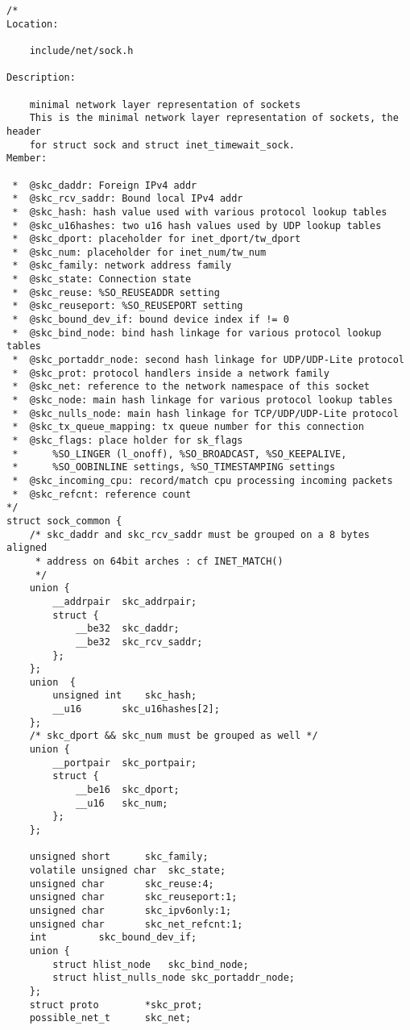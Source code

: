 \begin{verbatim}
/*
Location:

    include/net/sock.h

Description:

    minimal network layer representation of sockets
    This is the minimal network layer representation of sockets, the header
    for struct sock and struct inet_timewait_sock.
Member:

 *  @skc_daddr: Foreign IPv4 addr
 *  @skc_rcv_saddr: Bound local IPv4 addr
 *  @skc_hash: hash value used with various protocol lookup tables
 *  @skc_u16hashes: two u16 hash values used by UDP lookup tables
 *  @skc_dport: placeholder for inet_dport/tw_dport
 *  @skc_num: placeholder for inet_num/tw_num
 *  @skc_family: network address family
 *  @skc_state: Connection state
 *  @skc_reuse: %SO_REUSEADDR setting
 *  @skc_reuseport: %SO_REUSEPORT setting
 *  @skc_bound_dev_if: bound device index if != 0
 *  @skc_bind_node: bind hash linkage for various protocol lookup tables
 *  @skc_portaddr_node: second hash linkage for UDP/UDP-Lite protocol
 *  @skc_prot: protocol handlers inside a network family
 *  @skc_net: reference to the network namespace of this socket
 *  @skc_node: main hash linkage for various protocol lookup tables
 *  @skc_nulls_node: main hash linkage for TCP/UDP/UDP-Lite protocol
 *  @skc_tx_queue_mapping: tx queue number for this connection
 *  @skc_flags: place holder for sk_flags
 *      %SO_LINGER (l_onoff), %SO_BROADCAST, %SO_KEEPALIVE,
 *      %SO_OOBINLINE settings, %SO_TIMESTAMPING settings
 *  @skc_incoming_cpu: record/match cpu processing incoming packets
 *  @skc_refcnt: reference count
*/
struct sock_common {
    /* skc_daddr and skc_rcv_saddr must be grouped on a 8 bytes aligned
     * address on 64bit arches : cf INET_MATCH()
     */
    union {
        __addrpair  skc_addrpair;
        struct {
            __be32  skc_daddr;
            __be32  skc_rcv_saddr;
        };
    };
    union  {
        unsigned int    skc_hash;
        __u16       skc_u16hashes[2];
    };
    /* skc_dport && skc_num must be grouped as well */
    union {
        __portpair  skc_portpair;
        struct {
            __be16  skc_dport;
            __u16   skc_num;
        };
    };

    unsigned short      skc_family;
    volatile unsigned char  skc_state;
    unsigned char       skc_reuse:4;
    unsigned char       skc_reuseport:1;
    unsigned char       skc_ipv6only:1;
    unsigned char       skc_net_refcnt:1;
    int         skc_bound_dev_if;
    union {
        struct hlist_node   skc_bind_node;
        struct hlist_nulls_node skc_portaddr_node;
    };
    struct proto        *skc_prot;
    possible_net_t      skc_net;


\end{verbatim}
